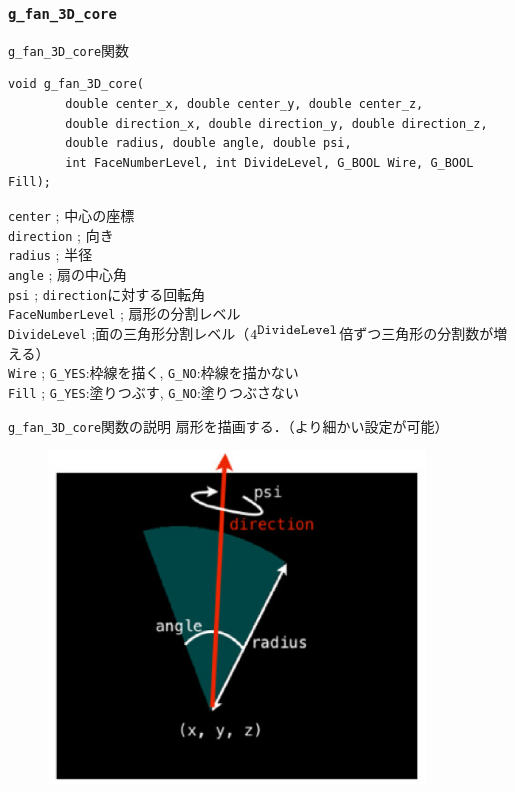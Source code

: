 \documentclass[platex,a4paper,12pt]{jsarticle}%
\begin{document}
\clearpage
\subsubsection{\texttt{g\_fan\_3D\_core}}

\begin{itembox}[l]{\texttt{g\_fan\_3D\_core}関数}
\begin{verbatim}
void g_fan_3D_core(
        double center_x, double center_y, double center_z,
        double direction_x, double direction_y, double direction_z,
        double radius, double angle, double psi,
        int FaceNumberLevel, int DivideLevel, G_BOOL Wire, G_BOOL Fill);
\end{verbatim}
\verb|center| ; 中心の座標\\
\verb|direction| ; 向き\\
\verb|radius| ; 半径\\
\verb|angle| ; 扇の中心角\\
\verb|psi| ; \verb|direction|に対する回転角\\
\verb|FaceNumberLevel| ; 扇形の分割レベル\\
\verb|DivideLevel| ;面の三角形分割レベル（$4^{\verb|DivideLevel|}$倍ずつ三角形の分割数が増える）\\
\verb|Wire| ; \verb|G_YES|:枠線を描く, \verb|G_NO|:枠線を描かない \\
\verb|Fill| ; \verb|G_YES|:塗りつぶす, \verb|G_NO|:塗りつぶさない 
\end{itembox}

\begin{itembox}[l]{\texttt{g\_fan\_3D\_core}関数の説明}
扇形を描画する．（より細かい設定が可能）
\end{itembox}
\begin{figure}[htb]
\centering
	\includegraphics[width=100mm]{Canvas_g_fan.eps}
\end{figure}
\end{document}

